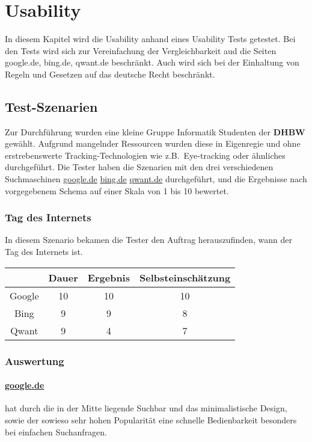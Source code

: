 \section{Usability}\label{sec:usability}

In diesem Kapitel wird die Usability anhand eines Usability Tests getestet.
Bei den Tests wird sich zur Vereinfachung der Vergleichbarkeit aud die Seiten google.de, bing.de, qwant.de beschränkt.
Auch wird sich bei der Einhaltung von Regeln und Gesetzen auf das deutsche Recht beschränkt.

\subsection{Test-Szenarien}\label{subsec:szenarien}
Zur Durchführung wurden eine kleine Gruppe Informatik Studenten der \textbf{DHBW} gewählt.
Aufgrund mangelnder Ressourcen wurden diese in Eigenregie und ohne erstrebenswerte Tracking-Technologien wie z.B.\ Eye-tracking oder ähnliches durchgeführt.
Die Tester haben die Szenarien mit den drei verschiedenen Suchmaschinen \url{google.de} \url{bing.de} \url{qwant.de} durchgeführt,
und die Ergebnisse nach vorgegebenem Schema auf einer Skala von 1 bis 10 bewertet.

\subsubsection{Tag des Internets}\label{subsubsec:szenario1}
In diesem Szenario bekamen die Tester den Auftrag herauszufinden, wann der Tag des Internets ist.

\begin{tabular}{|c|c|c|c|}
    \hline
    & Dauer & Ergebnis & Selbsteinschätzung \\
    \hline
    Google & 10    & 10       & 10                 \\
    \hline
    Bing   & 9     & 9        & 8                  \\
    \hline
    Qwant  & 9     & 4        & 7                  \\
    \hline
\end{tabular}

\subsubsection*{Auswertung}
\paragraph{\url{google.de}}
hat durch die in der Mitte liegende Suchbar und das minimalistische Design,
sowie der sowieso sehr hohen Popularität eine schnelle Bedienbarkeit besonders bei einfachen Suchanfragen.\\

